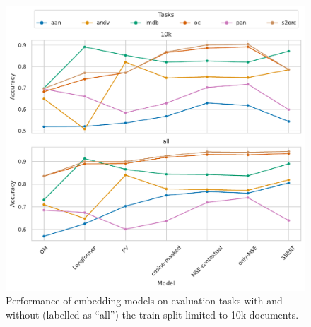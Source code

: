 










\begin{figure}

  \centering
  \includegraphics[width=\textwidth]{img/final_cls_evals.pdf}

  \caption{Performance of embedding models on evaluation tasks with and without
  (labelled as ``all'') the train split limited to 10k documents.}

  \label{fig:final_cls_evals}

\end{figure}


